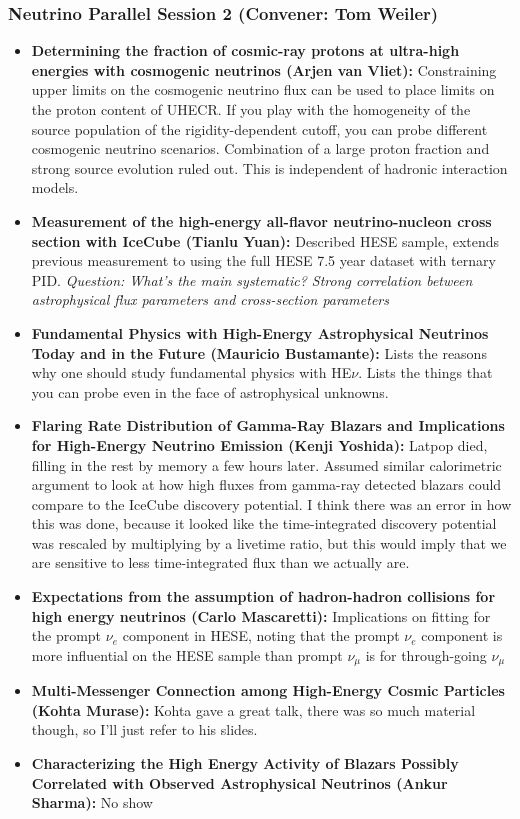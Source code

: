 \subsubsection{Neutrino Parallel Session 2 (Convener:  Tom Weiler)}
\begin{itemize}
    \item  \textbf{Determining the fraction of cosmic-ray protons at ultra-high energies with cosmogenic neutrinos (Arjen van Vliet):} Constraining upper limits on the cosmogenic neutrino flux can be used to place limits on the proton content of UHECR. If you play with the homogeneity of the source population of the rigidity-dependent cutoff, you can probe different cosmogenic neutrino scenarios. Combination of a large proton fraction and strong source evolution ruled out. This is independent of hadronic interaction models.
    \item \textbf{Measurement of the high-energy all-flavor neutrino-nucleon cross section with IceCube (Tianlu Yuan):} Described HESE sample, extends previous measurement to using the full HESE 7.5 year dataset with ternary PID. \textit{Question: What's the main systematic? Strong correlation between astrophysical flux parameters and cross-section parameters}
    \item\textbf{Fundamental Physics with High-Energy Astrophysical Neutrinos Today and in the Future (Mauricio Bustamante):} Lists the reasons why one should study fundamental physics with HE$\nu$. Lists the things that you can probe even in the face of astrophysical unknowns.
    \item \textbf{Flaring Rate Distribution of Gamma-Ray Blazars and Implications for High-Energy Neutrino Emission (Kenji Yoshida):} Latpop died, filling in the rest by memory a few hours later. Assumed similar calorimetric argument to look at how high fluxes from gamma-ray detected blazars could compare to the IceCube discovery potential. I think there was an error in how this was done, because it looked like the time-integrated discovery potential was rescaled by multiplying by a livetime ratio, but this would imply that we are sensitive to less time-integrated flux than we actually are. 
    \item \textbf{Expectations from the assumption of hadron-hadron collisions for high energy neutrinos (Carlo Mascaretti):} Implications on fitting for the prompt $\nu_e$ component in HESE, noting that the prompt $\nu_{e}$ component is more influential on the HESE sample than prompt $\nu_{\mu}$ is for through-going $\nu_{\mu}$
    \item \textbf{Multi-Messenger Connection among High-Energy Cosmic Particles (Kohta Murase):} Kohta gave a great talk, there was so much material though, so I'll just refer to his slides.
    \item \textbf{Characterizing the High Energy Activity of Blazars Possibly Correlated with Observed Astrophysical Neutrinos (Ankur Sharma):} No show
\end{itemize}

